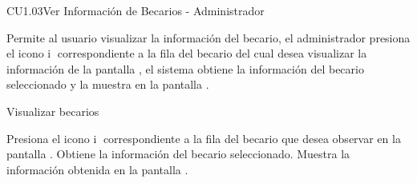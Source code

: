 \begin{UseCase}{CU1.03}{Ver Información de Becarios - Administrador }{
    Permite al usuario  visualizar la información del becario, el administrador presiona el icono \textcircled{i} correspondiente a la fila del becario del cual desea visualizar la información de la pantalla , el sistema obtiene la información del becario seleccionado y la muestra en la pantalla .
    
    
    \bigskip
}
		
\end{UseCase}
	
	\begin{UCtrayectoria}{Visualizar becarios }
	
		\UCpaso[\UCactor] Presiona el icono \textcircled{i} correspondiente a la fila del becario que desea observar en la pantalla .
		\UCpaso[\UCsist] Obtiene la información del becario seleccionado.
		\UCpaso[\UCsist] Muestra la información obtenida en la pantalla . 
       
		
	\end{UCtrayectoria}

